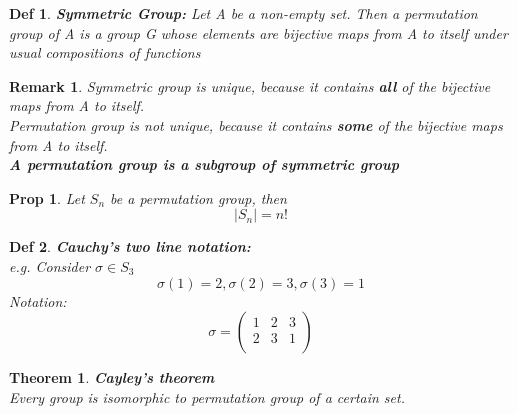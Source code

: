 \documentclass{article}
\newtheorem*{remark}{Remark}
\newtheorem*{theorem}{Theorem}
\newtheorem*{definition}{Def}
\newtheorem*{proposition}{Prop}
\begin{document}
    \begin{definition}
        \textbf{Symmetric Group:} Let A be a non-empty set. Then 
        a permutation group of A is a group G whose elements are 
        bijective maps from A to itself under usual compositions of functions
    \end{definition}

    \begin{remark}
        Symmetric group is unique, because it contains \textbf{all} of the bijective maps
        from A to itself. \\
        Permutation group is not unique, because it contains \textbf{some} of the bijective maps
        from A to itself.\\
        \textbf{A permutation group is a subgroup of symmetric group}
    \end{remark}
    
    \begin{proposition}
        Let \(S_n\) be a permutation group, then \[|S_n|=n!\] 
    \end{proposition}
    \begin{definition}
        \textbf{Cauchy's two line notation:}\\
        e.g. Consider \(\sigma \in S_3\)
        \[\sigma (1) = 2, \sigma (2) = 3, \sigma (3)=1\]
        Notation: \[\sigma = \left( {\begin{array}{ccc}
            1 & 2 & 3\\
            2 & 3 & 1 \\
        \end{array}}  \right)\]
    \end{definition}

    \begin{theorem}
        \textbf{Cayley's theorem}\\
        Every group is isomorphic to permutation group of a certain set.
    \end{theorem}
\end{document}
